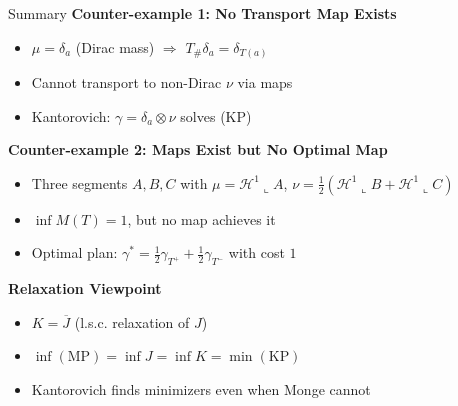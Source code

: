 \documentclass[aspectratio=169]{beamer}
\newcommand{\Hone}{\mathcal{H}^1}
\begin{document}
\begin{frame}{Summary}
\textbf{Counter-example 1: No Transport Map Exists}
\begin{itemize}
    \item $\mu = \delta_a$ (Dirac mass) $\Rightarrow$ $T_\# \delta_a = \delta_{T(a)}$
    \item Cannot transport to non-Dirac $\nu$ via maps
    \item Kantorovich: $\gamma = \delta_a \otimes \nu$ solves (KP)
\end{itemize}

\vspace{0.3cm}
\textbf{Counter-example 2: Maps Exist but No Optimal Map}
\begin{itemize}
    \item Three segments $A, B, C$ with $\mu = \Hone \llcorner A$, $\nu = \frac{1}{2}(\Hone \llcorner B + \Hone \llcorner C)$
    \item $\inf M(T) = 1$, but no map achieves it
    \item Optimal plan: $\gamma^* = \frac{1}{2}\gamma_{T^+} + \frac{1}{2}\gamma_{T^-}$ with cost $1$
\end{itemize}

\vspace{0.3cm}
\textbf{Relaxation Viewpoint}
\begin{itemize}
    \item $K = \overline{J}$ (l.s.c. relaxation of $J$)
    \item $\inf(\text{MP}) = \inf J = \inf K = \min(\text{KP})$
    \item Kantorovich finds minimizers even when Monge cannot
\end{itemize}
\end{frame}
\end{document}
